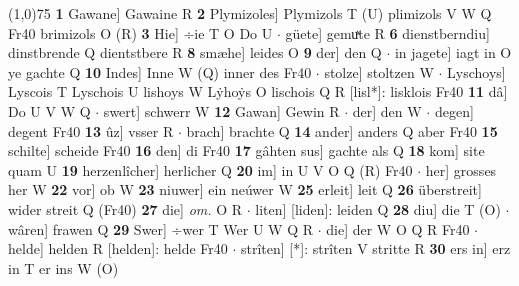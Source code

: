 \documentclass[8pt,a4paper,notitlepage]{article}
\begin{document}
\begin{table}[ht]
\begin{minipage}[t]{0.5\linewidth}
\line(1,0){75} \newline
\textbf{1} Gawane] Gawaine R \textbf{2} Plymizoles] Plymizols T (U) plimizols V W Q Fr40 brimizols O (R) \textbf{3} Hie] ÷ie T O Do U  $\cdot$ güete] gemuͯte R \textbf{6} dienstberndiu] dinstbrende Q dientstbere R \textbf{8} smæhe] leides O \textbf{9} der] den Q  $\cdot$ in jagete] iagt in O ye gachte Q \textbf{10} Indes] Inne W (Q) inner des Fr40  $\cdot$ stolze] stoltzen W  $\cdot$ Lyschoys] Lyscois T Lyschois U lishoys W Lẏhoẏs O lischois Q R [lisl*]: lisklois Fr40 \textbf{11} dâ] Do U V W Q  $\cdot$ swert] schwerr W \textbf{12} Gawan] Gewin R  $\cdot$ der] den W  $\cdot$ degen] degent Fr40 \textbf{13} ûz] vsser R  $\cdot$ brach] brachte Q \textbf{14} ander] anders Q aber Fr40 \textbf{15} schilte] scheide Fr40 \textbf{16} den] di Fr40 \textbf{17} gâhten sus] gachte als Q \textbf{18} kom] site quam U \textbf{19} herzenlîcher] herlicher Q \textbf{20} im] in U V O Q (R) Fr40  $\cdot$ her] grosses her W \textbf{22} vor] ob W \textbf{23} niuwer] ein neúwer W \textbf{25} erleit] leit Q \textbf{26} überstreit] wider streit Q (Fr40) \textbf{27} die] \textit{om.} O R  $\cdot$ liten] [liden]: leiden Q \textbf{28} diu] die T (O)  $\cdot$ wâren] frawen Q \textbf{29} Swer] ÷wer T Wer U W Q R  $\cdot$ die] der W O Q R Fr40  $\cdot$ helde] helden R [helden]: helde Fr40  $\cdot$ strîten] [*]: strîten V stritte R \textbf{30} ers in] erz in T er ins W (O) \newline
\end{minipage}
\end{table}
\end{document}
